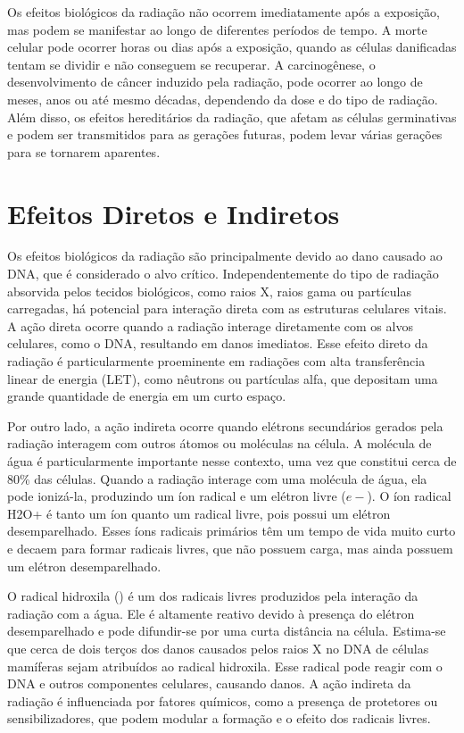 \documentclass[11pt,a4paper]{article}
\begin{document}
    Os efeitos biológicos da radiação não ocorrem imediatamente após a exposição, mas podem se manifestar ao longo de diferentes períodos de tempo. A morte celular pode ocorrer horas ou dias após a exposição, quando as células danificadas tentam se dividir e não conseguem se recuperar. A carcinogênese, o desenvolvimento de câncer induzido pela radiação, pode ocorrer ao longo de meses, anos ou até mesmo décadas, dependendo da dose e do tipo de radiação. Além disso, os efeitos hereditários da radiação, que afetam as células germinativas e podem ser transmitidos para as gerações futuras, podem levar várias gerações para se tornarem aparentes.


\section{Efeitos Diretos e Indiretos}

    Os efeitos biológicos da radiação são principalmente devido ao dano causado ao DNA, que é considerado o alvo crítico. Independentemente do tipo de radiação absorvida pelos tecidos biológicos, como raios X, raios gama ou partículas carregadas, há potencial para interação direta com as estruturas celulares vitais. A ação direta ocorre quando a radiação interage diretamente com os alvos celulares, como o DNA, resultando em danos imediatos. Esse efeito direto da radiação é particularmente proeminente em radiações com alta transferência linear de energia (LET), como nêutrons ou partículas alfa, que depositam uma grande quantidade de energia em um curto espaço.

    Por outro lado, a ação indireta ocorre quando elétrons secundários gerados pela radiação interagem com outros átomos ou moléculas na célula. A molécula de água é particularmente importante nesse contexto, uma vez que constitui cerca de 80\% das células. Quando a radiação interage com uma molécula de água, ela pode ionizá-la, produzindo um íon radical  e um elétron livre ($e-$). O íon radical H2O+ é tanto um íon quanto um radical livre, pois possui um elétron desemparelhado. Esses íons radicais primários têm um tempo de vida muito curto e decaem para formar radicais livres, que não possuem carga, mas ainda possuem um elétron desemparelhado.

    O radical hidroxila () é um dos radicais livres produzidos pela interação da radiação com a água. Ele é altamente reativo devido à presença do elétron desemparelhado e pode difundir-se por uma curta distância na célula. Estima-se que cerca de dois terços dos danos causados pelos raios X no DNA de células mamíferas sejam atribuídos ao radical hidroxila. Esse radical pode reagir com o DNA e outros componentes celulares, causando danos. A ação indireta da radiação é influenciada por fatores químicos, como a presença de protetores ou sensibilizadores, que podem modular a formação e o efeito dos radicais livres.
\end{document}
